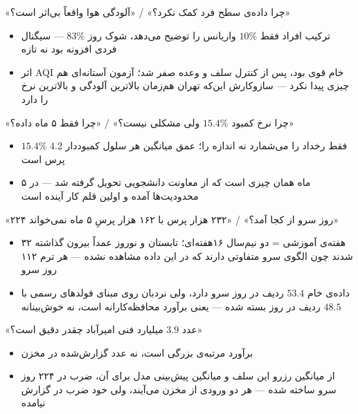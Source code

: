 \begin{frame}{«چرا داده‌ی سطح فرد کمک نکرد؟» / «آلودگی هوا واقعاً بی‌اثر است؟»}
  \begin{itemize}
    \item ترکیب افراد فقط $10\%$ واریانس را توضیح می‌دهد، شوک روز $83\%$ — سیگنال فردی
      افزونه بود نه تازه
    \item اثر AQI خام قوی بود، پس از کنترل سلف و وعده صفر شد؛ آزمون آستانه‌ای هم چیزی پیدا
      نکرد — سازوکارش این‌که تهران هم‌زمان بالاترین آلودگی و بالاترین نرخ را دارد
  \end{itemize}
\end{frame}

\begin{frame}{«چرا نرخ کمبود $15.4\%$ ولی مشکلی نیست؟» / «چرا فقط ۵ ماه داده؟»}
  \begin{itemize}
    \item $15.4\%$ فقط رخداد را می‌شمارد نه اندازه را؛ عمق میانگین هر سلول کمبوددار $4.2$
      پرس است
    \item ۵ ماه همان چیزی است که از معاونت دانشجویی تحویل گرفته شد — در محدودیت‌ها آمده و
      اولین قلم کار آینده است
  \end{itemize}
\end{frame}

\begin{frame}{«۲۲۴ روز سرو از کجا آمد؟» / «۲۳۲ هزار پرس با ۱۶۲ هزار پرسِ ۵ ماه نمی‌خواند»}
  \begin{itemize}
    \item ۳۲ هفته‌ی آموزشی = دو نیم‌سال ۱۶هفته‌ای؛ تابستان و نوروز عمداً بیرون گذاشته شدند
      چون الگوی سرو متفاوتی دارند که در این داده مشاهده نشده — هر ترم ۱۱۲ روز سرو
    \item داده‌ی خام $53.4$ ردیف در روز سرو دارد، ولی نردبان روی مبنای فولدهای رسمی با
      $48.5$ ردیف در روز بسته شده — یعنی برآورد محافظه‌کارانه است، نه خوش‌بینانه
  \end{itemize}
\end{frame}

\begin{frame}{«عدد $3.9$ میلیارد فنی امیرآباد چقدر دقیق است؟»}
  \begin{itemize}
    \item برآورد مرتبه‌ی بزرگی است، نه عدد گزارش‌شده در مخزن
    \item از میانگین رزرو این سلف و میانگین پیش‌بینی مدل برای آن، ضرب در ۲۲۴ روز سرو ساخته
      شده — هر دو ورودی از مخزن می‌آیند، ولی خود ضرب در گزارش نیامده
  \end{itemize}
\end{frame}
